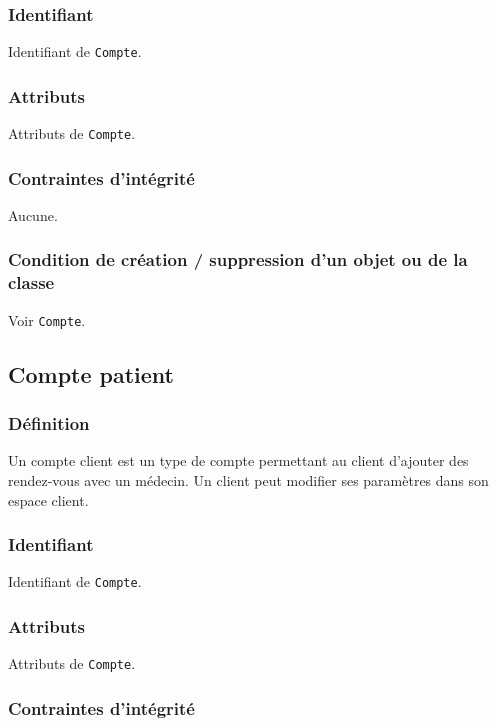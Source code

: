 \documentclass[a4paper, 11pt]{report}
\begin{document}
\subsubsection{Identifiant}

Identifiant de \texttt{Compte}.

\subsubsection{Attributs}

Attributs de \texttt{Compte}.

\subsubsection{Contraintes d'intégrité}

Aucune.

\subsubsection{Condition de création / suppression d'un objet ou de la classe}

Voir \texttt{Compte}.

\subsection{Compte patient}

\subsubsection{Définition}

Un compte client est un type de compte permettant au client d'ajouter des rendez-vous avec un médecin.
Un client peut modifier ses paramètres dans son espace client.

\subsubsection{Identifiant}

Identifiant de \texttt{Compte}.

\subsubsection{Attributs}

Attributs de \texttt{Compte}.

\subsubsection{Contraintes d'intégrité}
\end{document}
